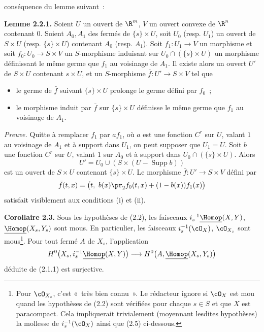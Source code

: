 conséquence du lemme suivant~:

\textbf{Lemme 2.2.1.} Soient $U$ un ouvert de $\R^m$, $V$ un ouvert convexe de $\R^n$ contenant $0$. Soient $A_0,A_1$ des fermés de $\{s\}\times U$, soit $U_0$ (resp. $U_1$) un ouvert de $S\times U$ (resp. $\{s\}\times U$) contenant $A_0$ (resp. $A_1$). Soit $f_1:U_1\to V$ un morphisme et soit $f_0:U_0\to S\times V$ un $S$-morphisme induisant sur $U_0\cap(\{s\}\times U)$ un morphisme définissant le même germe que $f_1$ au voisinage de $A_1$. Il existe alors un ouvert $U'$ de $S\times U$ contenant $s\times U$, et un $S$-morphisme $\bar f:U'\longrightarrow S\times V$ tel que
\begin{itemize}
\item[(i)] le germe de $\bar f$ suivant $\{s\}\times U$ prolonge le germe défini par $f_0$~;
\item[(ii)] le morphisme induit par $\bar f$ sur $\{s\}\times U$ définisse le même germe que $f_1$ au voisinage de $A_1$.
\end{itemize}

\emph{Preuve.} Quitte à remplacer $f_1$ par $af_1$, où $a$ est une fonction $C^r$ sur $U$, valant $1$ au voisinage de $A_1$ et à support dans $U_1$, on peut supposer que $U_1=U$. Soit $b$ une fonction $C^r$ sur $U$, valant $1$ sur $A_0$ et à support dans $U_0\cap(\{s\}\times U)$. Alors
\[
  U'=U_0\cup(S\times(U-\operatorname{Supp}b))
\]
est un ouvert de $S\times U$ contenant $\{s\}\times U$. Le morphisme $\bar f:U'\to S\times V$ défini par
\[
  \bar f(t,x)=\bigl(t,\ b(x)\pr_2f_0(t,x)+(1-b(x))f_1(x)\bigr)
\]
satisfait visiblement aux conditions (i) et (ii).

\textbf{Corollaire 2.3.} Sous les hypothèses de (2.2), les faisceaux $i_s^{-1}\underline{\Homop}(X,Y)$, $\underline{\Homop}(X_s,Y_s)$ sont mous. En particulier, les faisceaux $i_s^{-1}(\cO_X)$, $\cO_{X_s}$ sont mous\footnote{Pour $\cO_{X_s}$, c'est «~très bien connu~». Le rédacteur ignore si $\cO_X$ est mou quand les hypothèses de (2.2) sont vérifiées pour chaque $s\in S$ et que $X$ est paracompact. Cela impliquerait trivialement (moyennant lesdites hypothèses) la mollesse de $i_s^{-1}(\cO_X)$ ainsi que (2.5) ci-dessous.}. Pour tout fermé $A$ de $X_s$, l'application
\[
  H^0\bigl(X_s,i_s^{-1}\underline{\Homop}(X,Y)\bigr)
  \longrightarrow
  H^0\bigl(A,\underline{\Homop}(X_s,Y_s)\bigr)
\]
déduite de (2.1.1) est surjective.

